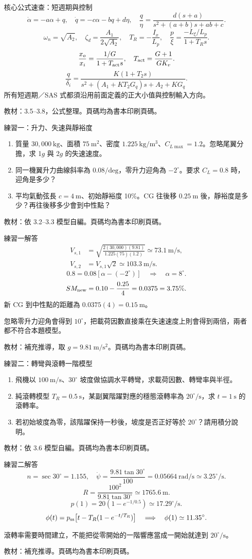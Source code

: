 \documentclass[aspectratio=169,11pt]{beamer}
\newcommand{\src}[1]{\par\vfill{\scriptsize\color{teal}教材：#1。頁碼均為書本印刷頁碼。}}
\newcommand{\slide}[3]{\begin{frame}[t]{#1}#3\src{#2}\end{frame}}
\newcommand{\key}[1]{\par\medskip{\color{teal}\bfseries #1}\par\smallskip}
\begin{document}
\slide{核心公式速查：短週期與控制}{3.5--3.8，公式整理}{
\small
\[
\dot\alpha=-a\alpha+q,\quad\dot q=-c\alpha-bq+d\eta,\quad
\frac q\eta=\frac{d(s+a)}{s^2+(a+b)s+ab+c}.
\]
\[
\omega_n=\sqrt{A_2},\quad\zeta_d=\frac{A_1}{2\sqrt{A_2}},\quad
T_R=-\frac{I_x}{L_p},\quad \frac p\xi=\frac{-L_\xi/L_p}{1+T_Rs}.
\]
\[
\frac{x_o}{x_i}=\frac{1/G}{1+T_{\rm act}s},\quad
T_{\rm act}=\frac{G+1}{GK_v}.
\]
\[
\frac q{\delta_i}=
\frac{K(1+T_2s)}{s^2+(A_1+KT_2G_q)s+A_2+KG_q}.
\]
所有短週期／SAS 式都須沿用前面定義的正大小值與控制輸入方向。
}
\slide{練習一：升力、失速與靜裕度}{依 3.2--3.3 模型自編}{
\begin{enumerate}\setlength{\itemsep}{10pt}
\item 質量 $30{,}000\ \mathrm{kg}$、面積 $75\ \mathrm{m^2}$、密度 $1.225\ \mathrm{kg/m^3}$、$C_{L\max}=1.2$。忽略尾翼分擔，求 1$g$ 與 2$g$ 的失速速度。
\item 同一機翼升力曲線斜率為 $0.08/\mathrm{deg}$，零升力迎角為 $-2^\circ$。要求 $C_L=0.8$ 時，迎角是多少？
\item 平均氣動弦長 $c=4\ \mathrm{m}$、初始靜裕度 10\%。CG 往後移 $0.25\ \mathrm{m}$ 後，靜裕度是多少？再往後移多少會到中性點？
\end{enumerate}
}
\slide{練習一解答}{補充推導，取 $g=9.81\ \mathrm{m/s^2}$}{
\small
\[\begin{aligned}
V_{s,1}&=\sqrt{\frac{2(30{,}000)(9.81)}{1.225(75)(1.2)}}
\simeq73.1\ \mathrm{m/s},\\
V_{s,2}&=V_{s,1}\sqrt2\simeq103.3\ \mathrm{m/s}.
\end{aligned}\]
\[
0.8=0.08[\alpha-(-2^\circ)]
\quad\Longrightarrow\quad\alpha=8^\circ.
\]
\[
SM_{\rm new}=0.10-\frac{0.25}{4}=0.0375=3.75\%.
\]
新 CG 到中性點的距離為 $0.0375(4)=0.15\ \mathrm{m}$。
\key{常見錯誤}忽略零升力迎角會得到 $10^\circ$，把載荷因數直接乘在失速速度上則會得到兩倍，兩者都不符合本題模型。
}
\slide{練習二：轉彎與滾轉一階模型}{依 3.6 模型自編}{
\begin{enumerate}\setlength{\itemsep}{9pt}
\item 飛機以 $100\ \mathrm{m/s}$、$30^\circ$ 坡度做協調水平轉彎，求載荷因數、轉彎率與半徑。
\item 純滾轉模型 $T_R=0.5\ \mathrm{s}$，某副翼階躍對應的穩態滾轉率為 $20^\circ/\mathrm{s}$，求 $t=1\ \mathrm{s}$ 的滾轉率。
\item 若初始坡度為零，該階躍保持一秒後，坡度是否正好等於 $20^\circ$？請用積分說明。
\end{enumerate}
}
\slide{練習二解答}{補充推導}{
\small
\[
n=\sec30^\circ=1.155,\quad
\dot\psi=\frac{9.81\tan30^\circ}{100}
=0.05664\ \mathrm{rad/s}\simeq3.25^\circ/\mathrm{s}.
\]
\[
R=\frac{100^2}{9.81\tan30^\circ}\simeq1765.6\ \mathrm{m}.
\]
\[
p(1)=20(1-e^{-1/0.5})\simeq17.29^\circ/\mathrm{s}.
\]
\[
\phi(t)=p_{\rm ss}\big[t-T_R(1-e^{-t/T_R})\big]
\quad\Longrightarrow\quad
\phi(1)\simeq11.35^\circ.
\]
\key{原因}滾轉率需要時間建立，不能把從零開始的一階響應當成一開始就達到 $20^\circ/\mathrm{s}$。
}
\end{document}
